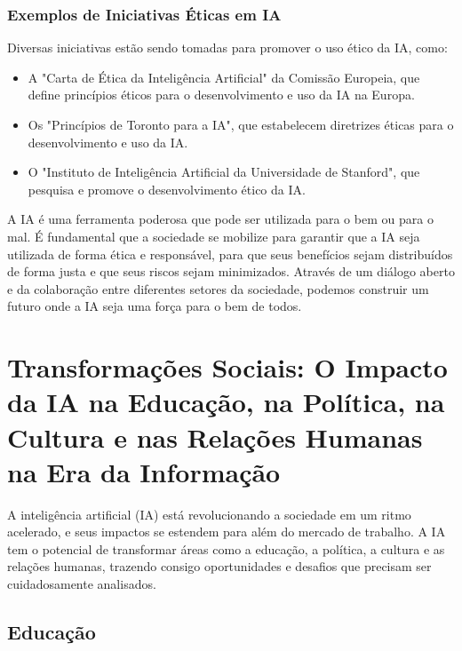 \documentclass[12pt,twoside]{book}
\begin{document}
\subsection{Exemplos de Iniciativas Éticas em IA}

Diversas iniciativas estão sendo tomadas para promover o uso ético da IA, como:
\begin{itemize}
    \item A "Carta de Ética da Inteligência Artificial" da Comissão Europeia, que define princípios éticos para o desenvolvimento e uso da IA na Europa.
    \item Os "Princípios de Toronto para a IA", que estabelecem diretrizes éticas para o desenvolvimento e uso da IA.
    \item O "Instituto de Inteligência Artificial da Universidade de Stanford", que pesquisa e promove o desenvolvimento ético da IA.
\end{itemize}

A IA é uma ferramenta poderosa que pode ser utilizada para o bem ou para o mal. É fundamental que a sociedade se mobilize para garantir que a IA seja utilizada de forma ética e responsável, para que seus benefícios sejam distribuídos de forma justa e que seus riscos sejam minimizados. Através de um diálogo aberto e da colaboração entre diferentes setores da sociedade, podemos construir um futuro onde a IA seja uma força para o bem de todos.

\chapter{Transformações Sociais: O Impacto da IA na Educação, na Política, na Cultura e nas Relações Humanas na Era da Informação}

A inteligência artificial (IA) está revolucionando a sociedade em um ritmo acelerado, e seus impactos se estendem para além do mercado de trabalho. A IA tem o potencial de transformar áreas como a educação, a política, a cultura e as relações humanas, trazendo consigo oportunidades e desafios que precisam ser cuidadosamente analisados.

\section{Educação}
\end{document}
